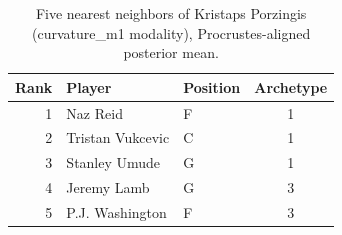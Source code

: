 \begin{table}[htbp]
  \centering\small
  \begin{tabular}{rllc}
    \toprule
    Rank & Player & Position & Archetype \\
    \midrule
    1 & Naz Reid & F & 1 \\
    2 & Tristan Vukcevic & C & 1 \\
    3 & Stanley Umude & G & 1 \\
    4 & Jeremy Lamb & G & 3 \\
    5 & P.J. Washington & F & 3 \\
    \bottomrule
  \end{tabular}
  \caption{Five nearest neighbors of Kristaps Porzingis (curvature_m1 modality), Procrustes-aligned posterior mean.}
  \label{tab:Kristaps_Porzingis_neighbors_curvature_m1}
\end{table}

